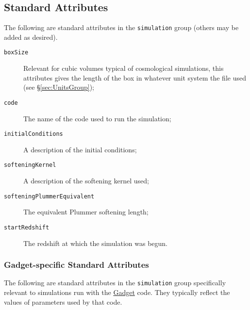 \subsection{Standard Attributes}

The following are standard attributes in the {\tt simulation} group (others may be added as desired).

\begin{description}
 \item [{\tt boxSize}] Relevant for cubic volumes typical of cosmological simulations, this attributes gives the length of the box in whatever unit system the file used (see \S\ref{sec:UnitsGroup});
 \item [{\tt code}] The name of the code used to run the simulation;
 \item [{\tt initialConditions}] A description of the initial conditions;
 \item [{\tt softeningKernel}] A description of the softening kernel used;
 \item [{\tt softeningPlummerEquivalent}] The equivalent Plummer softening length;
 \item [{\tt startRedshift}] The redshift at which the simulation was begun.
\end{description}

\subsubsection{{\sc Gadget}-specific Standard Attributes}

The following are standard attributes in the {\tt simulation} group specifically relevant to simulations run with the \href{http://www.mpa-garching.mpg.de/gadget/}{{\sc Gadget}} code. They typically reflect the values of parameters used by that code.

